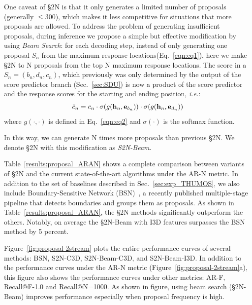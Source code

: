 \documentclass[10pt,journal,compsoc]{IEEEtran}
\begin{document}
One caveat of \S2N is that it only generates a limited number of proposals (generally $\leq 300$), which makes it less competitive for situations that more proposals are allowed. To address the problem of generating insufficient proposals, during inference we propose a simple but effective modification by using \emph{Beam Search}: for each decoding step, instead of only generating one proposal $S_n$ from the maximum response locations(Eq.~\ref{eqn:eq1}), here we make \S2N to N proposals from the top N maximum response locations. The score in a $S_n = (b_n, d_n, c_n)$, which previously was only determined by the output of the score predictor branch (Sec.~\ref{sec:SDU}) is now a product of the score predictor and the response scores for the starting and ending position, \emph{i.e.}:
\begin{equation}
    \Bar{c}_n = c_n \cdot \sigma (g ({\bf h}_n, {\bf e}_{b_n})) \cdot \sigma(g({\bf h}_n, {\bf e}_{d_n}))
\end{equation}
where $g(\cdot, \cdot)$ is defined in Eq.~\ref{eqn:eq2} and $\sigma(\cdot)$ is the softmax function.

In this way, we can generate N times more proposals than previous \S2N. We denote \S2N with this modification as \emph{S2N-Beam}.


Table~\ref{results:proposal_ARAN} shows a complete comparison between variants of \S2N and the current state-of-the-art algorithms under the AR-N metric. In addition to the set of baselines described in Sec.~\ref{sec:exp_THUMOS}, we also include Boundary-Sensitive Network (BSN)~\cite{lin2018BSN}, a recently published multiple-stage pipeline that detects boundaries and groups them as proposals. As shown in Table~\ref{results:proposal_ARAN}, the \S2N methods significantly outperform the others. Notably, on average the \S2N-Beam with I3D features surpasses the BSN method by 5 percent.

Figure~\ref{fig:proposal-2stream} plots the entire performance curves of several methods: BSN, S2N-C3D, S2N-Beam-C3D, and S2N-Beam-I3D. In addition to the performance curves under the AR-N metric (Figure~\ref{fig:proposal-2stream}a), this figure also shows the performance curves under other metrics: AR-F, Recall@F-1.0 and Recall@N=1000. As shown in figure, using beam search (\S2N-Beam) improves performance especially when proposal frequency is high.
\end{document}
